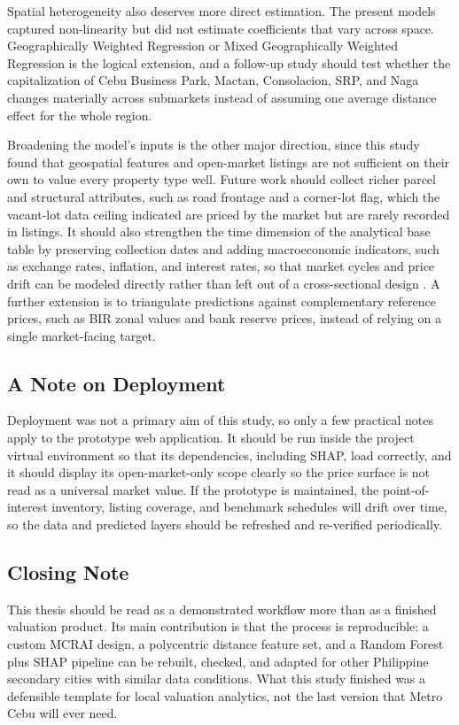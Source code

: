 Spatial heterogeneity also deserves more direct estimation. The present models captured non-linearity but did not estimate coefficients that vary across space. Geographically Weighted Regression or Mixed Geographically Weighted Regression is the logical extension, and a follow-up study should test whether the capitalization of Cebu Business Park, Mactan, Consolacion, SRP, and Naga changes materially across submarkets instead of assuming one average distance effect for the whole region.

Broadening the model's inputs is the other major direction, since this study found that geospatial features and open-market listings are not sufficient on their own to value every property type well. Future work should collect richer parcel and structural attributes, such as road frontage and a corner-lot flag, which the vacant-lot data ceiling indicated are priced by the market but are rarely recorded in listings. It should also strengthen the time dimension of the analytical base table by preserving collection dates and adding macroeconomic indicators, such as exchange rates, inflation, and interest rates, so that market cycles and price drift can be modeled directly rather than left out of a cross-sectional design \parencite{udomsap2020}. A further extension is to triangulate predictions against complementary reference prices, such as BIR zonal values and bank reserve prices, instead of relying on a single market-facing target.

\subsection{A Note on Deployment}\label{recommendations-for-deployment}

Deployment was not a primary aim of this study, so only a few practical notes apply to the prototype web application. It should be run inside the project virtual environment so that its dependencies, including SHAP, load correctly, and it should display its open-market-only scope clearly so the price surface is not read as a universal market value. If the prototype is maintained, the point-of-interest inventory, listing coverage, and benchmark schedules will drift over time, so the data and predicted layers should be refreshed and re-verified periodically.

\subsection{Closing Note}\label{closing-note}

This thesis should be read as a demonstrated workflow more than as a finished valuation product. Its main contribution is that the process is reproducible: a custom MCRAI design, a polycentric distance feature set, and a Random Forest plus SHAP pipeline can be rebuilt, checked, and adapted for other Philippine secondary cities with similar data conditions. What this study finished was a defensible template for local valuation analytics, not the last version that Metro Cebu will ever need.
